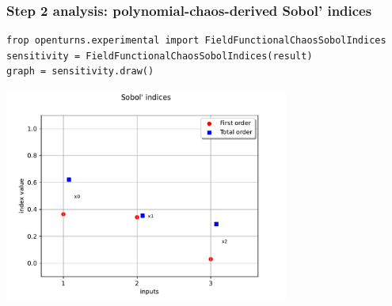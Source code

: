 \documentclass{beamer}
\begin{document}
\begin{frame}[containsverbatim]
\frametitle{Step 2 analysis: polynomial-chaos-derived Sobol' indices}

\begin{lstlisting}
frop openturns.experimental import FieldFunctionalChaosSobolIndices
sensitivity = FieldFunctionalChaosSobolIndices(result)
graph = sensitivity.draw()
\end{lstlisting}

\centering
\includegraphics[width=0.7\textwidth]{figures/sobol.pdf}

\end{frame}
  
\end{document}
